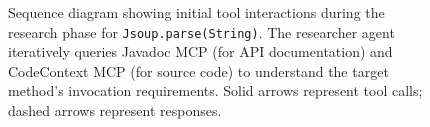 \begin{figure}[t]
\centering

\caption{Sequence diagram showing initial tool interactions during the research phase for \texttt{Jsoup.parse(String)}. The researcher agent iteratively queries Javadoc MCP (for API documentation) and CodeContext MCP (for source code) to understand the target method's invocation requirements. Solid arrows represent tool calls; dashed arrows represent responses.}
\label{fig:research-sequence}
\end{figure}